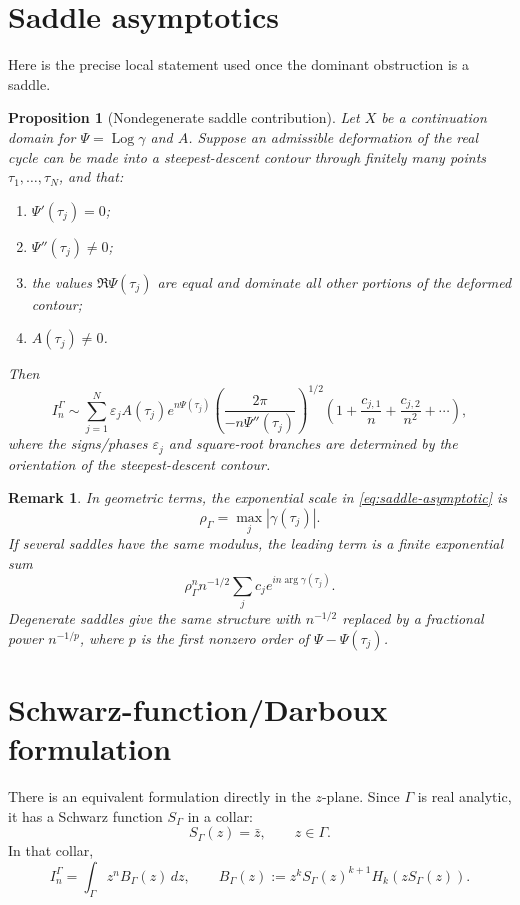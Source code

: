 \documentclass[11pt]{article}
\newtheorem{proposition}[theorem]{Proposition}
\newtheorem{remark}[theorem]{Remark}
\newcommand{\dd}{\,d}
\newcommand{\1}{\mathbf 1}
\newcommand{\Log}{\operatorname{Log}}
\begin{document}
\section{Saddle asymptotics}

Here is the precise local statement used once the dominant obstruction is a saddle.

\begin{proposition}[Nondegenerate saddle contribution]\label{prop:saddle}
Let \(X\) be a continuation domain for \(\Psi=\Log\gamma\) and \(A\). Suppose an
admissible deformation of the real cycle can be made into a steepest-descent contour
through finitely many points \(\tau_1,\dots,\tau_N\), and that:
\begin{enumerate}[label=(\roman*)]
\item \(\Psi'(\tau_j)=0\);
\item \(\Psi''(\tau_j)\ne0\);
\item the values \(\Re\Psi(\tau_j)\) are equal and dominate all other portions of the
deformed contour;
\item \(A(\tau_j)\ne0\).
\end{enumerate}
Then
\begin{equation}\label{eq:saddle-asymptotic}
  I_n^\Gamma
  \sim
  \sum_{j=1}^N
  \varepsilon_j
  A(\tau_j)e^{n\Psi(\tau_j)}
  \left(\frac{2\pi}{-n\Psi''(\tau_j)}\right)^{1/2}
  \left(1+\frac{c_{j,1}}{n}+\frac{c_{j,2}}{n^2}+\cdots\right),
\end{equation}
where the signs/phases \(\varepsilon_j\) and square-root branches are determined by the
orientation of the steepest-descent contour.
\end{proposition}

\begin{remark}
In geometric terms, the exponential scale in \eqref{eq:saddle-asymptotic} is
\[
  \rho_\Gamma=\max_j |\gamma(\tau_j)|.
\]
If several saddles have the same modulus, the leading term is a finite exponential sum
\[
  \rho_\Gamma^n n^{-1/2}
  \sum_j c_j e^{in\arg \gamma(\tau_j)} .
\]
Degenerate saddles give the same structure with \(n^{-1/2}\) replaced by a fractional
power \(n^{-1/p}\), where \(p\) is the first nonzero order of \(\Psi-\Psi(\tau_j)\).
\end{remark}

\section{Schwarz-function/Darboux formulation}

There is an equivalent formulation directly in the \(z\)-plane. Since \(\Gamma\) is
real analytic, it has a Schwarz function \(S_\Gamma\) in a collar:
\[
  S_\Gamma(z)=\bar z,\qquad z\in\Gamma.
\]
In that collar,
\begin{equation}\label{eq:B-schwarz}
  I_n^\Gamma=\int_\Gamma z^n B_\Gamma(z)\dd z,
  \qquad
  B_\Gamma(z):=z^k S_\Gamma(z)^{k+1}H_k(zS_\Gamma(z)).
\end{equation}
\end{document}

